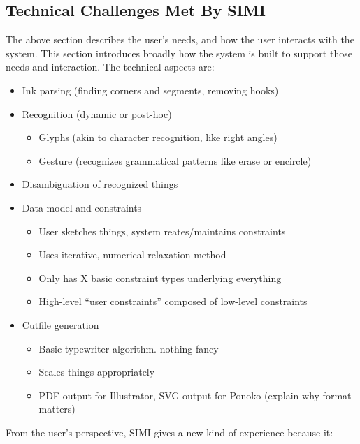 \subsection{Technical Challenges Met By SIMI}

The above section describes the user's needs, and how the user
interacts with the system. This section introduces broadly how the
system is built to support those needs and interaction. The technical
aspects are:

\begin{itemize}
\item Ink parsing (finding corners and segments, removing hooks)
\item Recognition (dynamic or post-hoc)
  \begin{itemize}
  \item Glyphs (akin to character recognition, like right angles)
  \item Gesture (recognizes grammatical patterns like erase or
    encircle)
  \end{itemize}
\item Disambiguation of recognized things
\item Data model and constraints
  \begin{itemize}
  \item User sketches things, system reates/maintains constraints
  \item Uses iterative, numerical relaxation method
  \item Only has X basic constraint types underlying everything
  \item High-level ``user constraints'' composed of low-level constraints
  \end{itemize}
\item Cutfile generation
  \begin{itemize}
  \item Basic typewriter algorithm. nothing fancy
  \item Scales things appropriately
  \item PDF output for Illustrator, SVG output for Ponoko (explain why
    format matters)
  \end{itemize}
\end{itemize}

From the user's perspective, SIMI gives a new kind of experience
because it:

